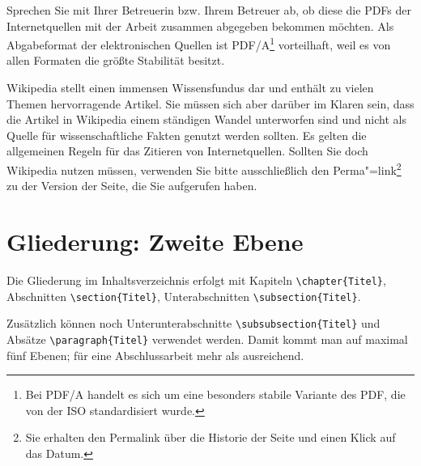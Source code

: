 Sprechen Sie mit Ihrer Betreuerin bzw. Ihrem Betreuer ab, ob diese die PDFs der Internetquellen mit der Arbeit zusammen abgegeben bekommen möchten. Als Abgabeformat der elektronischen Quellen ist PDF/A\footnote{Bei PDF/A handelt es sich um eine besonders stabile Variante des \ac{PDF}, die von der  \ac{ISO} standardisiert wurde.} vorteilhaft, weil es von allen Formaten die größte Stabilität besitzt.

Wikipedia stellt einen immensen Wissensfundus dar und enthält zu vielen Themen hervorragende Artikel. Sie müssen sich aber darüber im Klaren sein, dass die Artikel in Wikipedia einem ständigen Wandel unterworfen sind und nicht als Quelle für wissenschaftliche Fakten genutzt werden sollten. Es gelten die allgemeinen Regeln für das Zitieren von Internetquellen. Sollten Sie doch Wikipedia nutzen müssen, verwenden Sie bitte ausschließlich den Perma"=link\footnote{Sie erhalten den Permalink über die Historie der Seite und einen Klick auf das Datum.} zu der Version der Seite, die Sie aufgerufen haben.


\section{Gliederung: Zweite Ebene}

Die Gliederung im Inhaltsverzeichnis erfolgt mit Kapiteln \verb+\chapter{Titel}+, Abschnitten \verb+\section{Titel}+, Unterabschnitten \verb+\subsection{Titel}+.

Zusätzlich können noch Unterunterabschnitte \verb+\subsubsection{Titel}+ und Absätze \verb+\paragraph{Titel}+ verwendet werden. Damit kommt man auf maximal fünf Ebenen; für eine Abschlussarbeit mehr als ausreichend.

